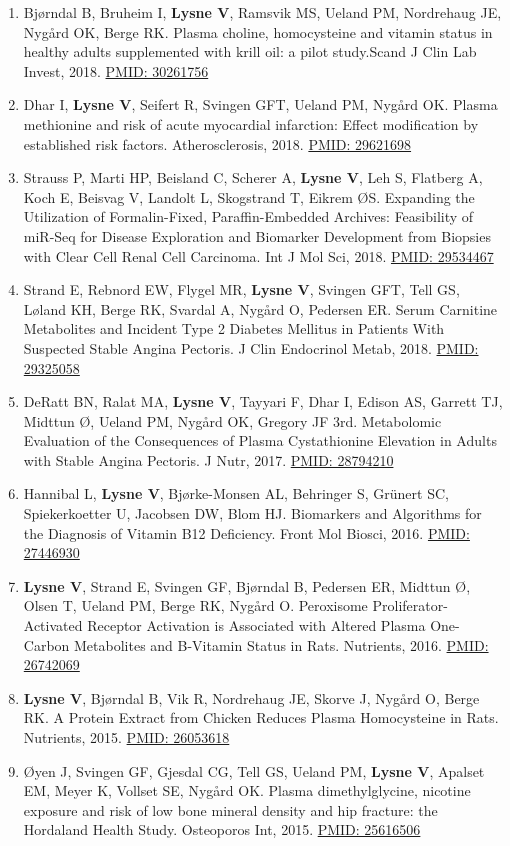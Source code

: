 \documentclass[11pt, a4paper]{awesome-cv}
\begin{document}
\begin{enumerate}
\item
  Bjørndal B, Bruheim I, \textbf{Lysne V}, Ramsvik MS, Ueland PM, Nordrehaug JE, Nygård OK, Berge RK. Plasma choline, homocysteine and vitamin status in healthy adults supplemented with krill oil: a pilot study.Scand J Clin Lab Invest, 2018. \href{https://www.ncbi.nlm.nih.gov/pubmed/30261756}{PMID: 30261756}
\item
  Dhar I, \textbf{Lysne V}, Seifert R, Svingen GFT, Ueland PM, Nygård OK. Plasma methionine and risk of acute myocardial infarction: Effect modification by established risk factors. Atherosclerosis, 2018. \href{https://www.ncbi.nlm.nih.gov/pubmed/29621698}{PMID: 29621698}
\item
  Strauss P, Marti HP, Beisland C, Scherer A, \textbf{Lysne V}, Leh S, Flatberg A, Koch E, Beisvag V, Landolt L, Skogstrand T, Eikrem ØS. Expanding the Utilization of Formalin-Fixed, Paraffin-Embedded Archives: Feasibility of miR-Seq for Disease Exploration and Biomarker Development from Biopsies with Clear Cell Renal Cell Carcinoma. Int J Mol Sci, 2018. \href{https://www.ncbi.nlm.nih.gov/pubmed/29534467}{PMID: 29534467}
\item
  Strand E, Rebnord EW, Flygel MR, \textbf{Lysne V}, Svingen GFT, Tell GS, Løland KH, Berge RK, Svardal A, Nygård O, Pedersen ER. Serum Carnitine Metabolites and Incident Type 2 Diabetes Mellitus in Patients With Suspected Stable Angina Pectoris. J Clin Endocrinol Metab, 2018. \href{https://www.ncbi.nlm.nih.gov/pubmed/29325058}{PMID: 29325058}
\item
  DeRatt BN, Ralat MA, \textbf{Lysne V}, Tayyari F, Dhar I, Edison AS, Garrett TJ, Midttun Ø, Ueland PM, Nygård OK, Gregory JF 3rd. Metabolomic Evaluation of the Consequences of Plasma Cystathionine Elevation in Adults with Stable Angina Pectoris. J Nutr, 2017. \href{https://www.ncbi.nlm.nih.gov/pubmed/28794210}{PMID: 28794210}
\item
  Hannibal L, \textbf{Lysne V}, Bjørke-Monsen AL, Behringer S, Grünert SC, Spiekerkoetter U, Jacobsen DW, Blom HJ. Biomarkers and Algorithms for the Diagnosis of Vitamin B12 Deficiency. Front Mol Biosci, 2016. \href{https://www.ncbi.nlm.nih.gov/pubmed/}{PMID: 27446930}
\item
  \textbf{Lysne V}, Strand E, Svingen GF, Bjørndal B, Pedersen ER, Midttun Ø, Olsen T, Ueland PM, Berge RK, Nygård O. Peroxisome Proliferator-Activated Receptor Activation is Associated with Altered Plasma One-Carbon Metabolites and B-Vitamin Status in Rats. Nutrients, 2016. \href{https://www.ncbi.nlm.nih.gov/pubmed/26742069}{PMID: 26742069}
\item
  \textbf{Lysne V}, Bjørndal B, Vik R, Nordrehaug JE, Skorve J, Nygård O, Berge RK. A Protein Extract from Chicken Reduces Plasma Homocysteine in Rats. Nutrients, 2015. \href{https://www.ncbi.nlm.nih.gov/pubmed/26053618}{PMID: 26053618}
\item
  Øyen J, Svingen GF, Gjesdal CG, Tell GS, Ueland PM, \textbf{Lysne V}, Apalset EM, Meyer K, Vollset SE, Nygård OK. Plasma dimethylglycine, nicotine exposure and risk of low bone mineral density and hip fracture: the Hordaland Health Study. Osteoporos Int, 2015. \href{https://www.ncbi.nlm.nih.gov/pubmed/25616506}{PMID: 25616506}
\end{enumerate}
\end{document}

